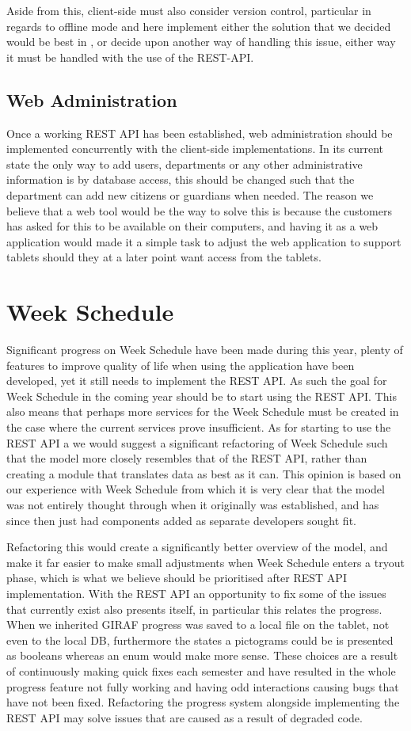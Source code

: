 Aside from this, client-side must also consider version control, particular in regards to offline mode and here implement either the solution that we decided would be best in , or decide upon another way of handling this issue, either way it must be handled with the use of the REST-API.

\subsection{Web Administration}
Once a working REST API has been established, web administration should be implemented concurrently with the client-side implementations.
In its current state the only way to add users, departments or any other administrative information is by database access, this should be changed such that the department can add new citizens or guardians when needed.
The reason we believe that a web tool would be the way to solve this is because the customers has asked for this to be available on their computers, and having it as a web application would made it a simple task to adjust the web application to support tablets should they at a later point want access from the tablets.

\section{Week Schedule}
Significant progress on Week Schedule have been made during this year, plenty of features to improve quality of life when using the application have been developed, yet it still needs to implement the REST API.
As such the goal for Week Schedule in the coming year should be to start using the REST API.
This also means that perhaps more services for the Week Schedule must be created in the case where the current services prove insufficient.
As for starting to use the REST API a we would suggest a significant refactoring of Week Schedule such that the model more closely resembles that of the REST API, rather than creating a module that translates data as best as it can.
This opinion is based on our experience with Week Schedule from which it is very clear that the model was not entirely thought through when it originally was established, and has since then just had components added as separate developers sought fit.

Refactoring this would create a significantly better overview of the model, and make it far easier to make small adjustments when Week Schedule enters a tryout phase, which is what we believe should be prioritised after REST API implementation.
With the REST API an opportunity to fix some of the issues that currently exist also presents itself, in particular this relates the progress.
When we inherited GIRAF progress was saved to a local file on the tablet, not even to the local DB, furthermore the states a pictograms could be is presented as booleans whereas an enum would make more sense.
These choices are a result of continuously making quick fixes each semester and have resulted in the whole progress feature not fully working and having odd interactions causing bugs that have not been fixed.
Refactoring the progress system alongside implementing the REST API may solve issues that are caused as a result of degraded code.


